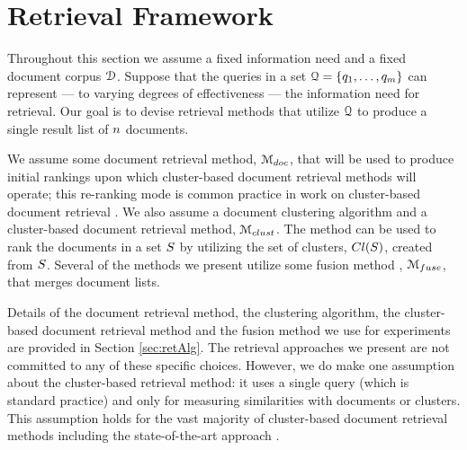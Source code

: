 \section{Retrieval Framework}
Throughout this section we assume a fixed information need and a fixed document corpus ${\mathcal D}$. Suppose that the queries in a set 
${\mathcal Q}=\{q_1,\ldots,q_{m}\}$ can represent --- to varying degrees of effectiveness
--- the information need for retrieval. Our goal is to devise retrieval methods that
utilize ${\mathcal Q}$ to produce a single result list of $n$ documents. 

We assume some document retrieval
method, ${\mathcal M_{doc}}$, that will be used to produce initial rankings
upon which cluster-based document retrieval methods will operate; this re-ranking mode is common practice in work on cluster-based document retrieval 
\cite{Kurland+Lee:06a,Liu+Croft:06a,Liu+Croft:06b,Liu+Croft:08a,kurland:08a,Kurland+Krikon:11a,Raiber+Kurland:13a}. We also assume a document clustering algorithm and a cluster-based
  document retrieval method, $\mathcal M_{clust}$. The method can be used
  to rank the documents in a set $S$ by utilizing
  the set of clusters, $Cl(S)$, created from
  $S$. Several of the methods we present utilize some
  fusion method \cite{Croft:00b}, ${\mathcal M_{fuse}}$, that merges document lists. 

  Details of the document retrieval method, the clustering algorithm,
  the cluster-based document retrieval method and the fusion method we
  use for experiments are provided in Section \ref{sec:retAlg}. The
  retrieval approaches we present are not committed to any of these
  specific choices. However, we do make one assumption about the cluster-based
  retrieval method: it uses a single query (which is standard
  practice) and only for measuring similarities with documents or clusters. This assumption holds for the vast majority of cluster-based document
  retrieval methods \cite{Kurland+Lee:04a,Liu+Croft:04a,Kurland+Lee:06a,Liu+Croft:06a,Liu+Croft:06b,Kurland+Domshlak:08a,Kurland:09a,Kurland+Krikon:11a,Raiber+Kurland:13a} including the
  state-of-the-art approach \cite{Raiber+Kurland:13a}.


